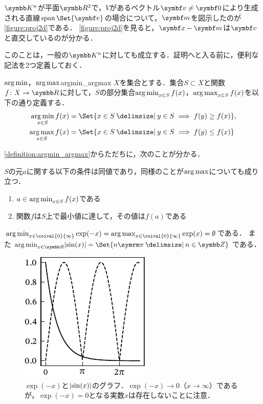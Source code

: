 \documentclass[../../main]{subfiles}
\begin{document}
\(\numset{K}^n\)が平面\(\numset{R}^2\)で，\(V\)があるベクトル\(\vect{v}\neq\zvec\)により生成される直線\(\spannedby\Set{\vect{v}}\)の場合について，\(\vect{m}\)を図示したのが\cref{figure:proj2d}である．
\cref{figure:proj2d}を見ると，\(\vect{x}-\vect{m}\)は\(\vect{v}\)と直交しているのが分かる．

このことは，一般の\(\numset{K}^n\)に対しても成立する．証明へと入る前に，便利な記法を2つ定義しておく．

\begin{definition}{\(\argmin\)，\(\argmax\)}{argmin_argmax}\index{\(\argmin\)}\index{\(\argmax\)}
  \(X\)を集合とする．集合\(S\subset X\)と関数\(f\colon X\to\numset{R}\)に対して，\(S\)の部分集合\(\operatorname*{arg\,min}_{x\in S}f(x)\)，\(\operatorname*{arg\,max}_{x\in S}f(x)\)を以下の通り定義する．
  \begin{align*}
    \argmin_{x\in S}f(x) &= \Set{x\in S\given y\in S\implies f(y)\geq f(x)}, \\
    \argmax_{x\in S}f(x) &= \Set{x\in S\given y\in S\implies f(y)\leq f(x)}
  \end{align*}
\end{definition}

\cref{definition:argmin_argmax}からただちに，次のことが分かる．

\begin{proposition}{}{}
  \(S\)の元\(a\)に関する以下の条件は同値であり，同様のことが\(\argmax\)についても成り立つ．
  \begin{enumerate}
    \item \(a\in\operatorname*{arg\,min}_{x\in S}f(x)\)である
    \item 関数\(f\)は\(S\)上で最小値に達して，その値は\(f(a)\)である
  \end{enumerate}
\end{proposition}

\begin{example}
  \(\argmin_{x\in\coival{0}{\infty}}\exp(-x)=\argmax_{x\in\coival{0}{\infty}}\exp(x)=\emptyset\)である．
  また\(\argmin_{x\in\numset{R}}\abs{\sin(x)}=\Set{n\krez\given n\in\numset{Z}}\)である．
\end{example}

\begin{figure}[htbp]
  \centering
  \includegraphics{argmin.pdf}
  \caption{\(\exp(-x)\)と\(\lvert\sin(x)\rvert\)のグラフ．\(\exp(-x)\to 0\)（\(x\to\infty\)）であるが，\(\exp(-x)=0\)となる実数\(x\)は存在しないことに注意．}
\end{figure}
\end{document}
